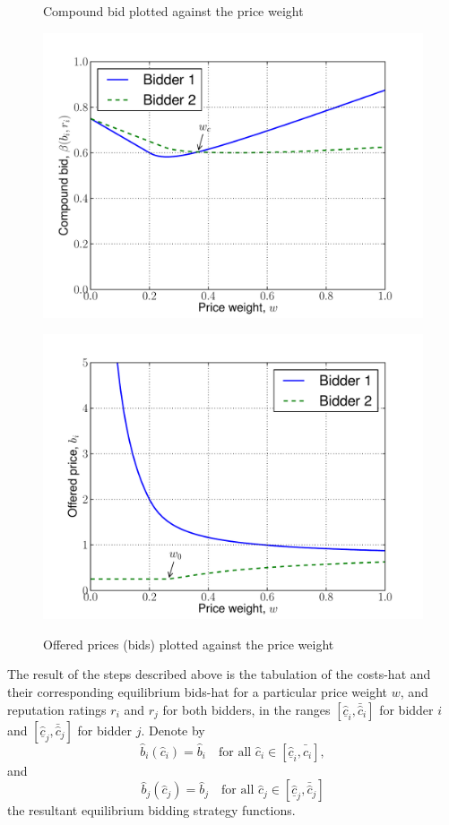 \begin{figure}[tp!]
	\caption{Compound bid plotted against the price weight}
	\includegraphics[width=\figsize]{2/Figures/indirect_bids}
	\label{fig:indirect_bids}
	\caption{Offered prices (bids) plotted against the price weight}
	\includegraphics[width=\figsize]{2/Figures/indirect_prices}
	\label{fig:indirect_prices}
\end{figure}

The result of the steps described above is the tabulation of the costs-hat and their corresponding equilibrium bids-hat for a particular price weight $w$, and reputation ratings $r_i$ and $r_j$ for both bidders, in the ranges $[\underline{\hat{c}}_i, \bar{\hat{c}}_i]$ for bidder $i$ and $[\underline{\hat{c}}_j, \bar{\hat{c}}_j]$ for bidder $j$. Denote by
\begin{equation}
  \label{eq:equi_bidding_str_i}
  \hat{b}_i(\hat{c}_i) = \hat{b}_i \quad\text{for all } \hat{c}_i\in[\underline{\hat{c}}_i, \bar{\hat{c}}_i],
\end{equation}
and
\begin{equation}
  \label{eq:equi_bidding_str_j}
  \hat{b}_j(\hat{c}_j) = \hat{b}_j \quad\text{for all } \hat{c}_j\in[\underline{\hat{c}}_j, \bar{\hat{c}}_j]
\end{equation}
the resultant equilibrium bidding strategy functions.

